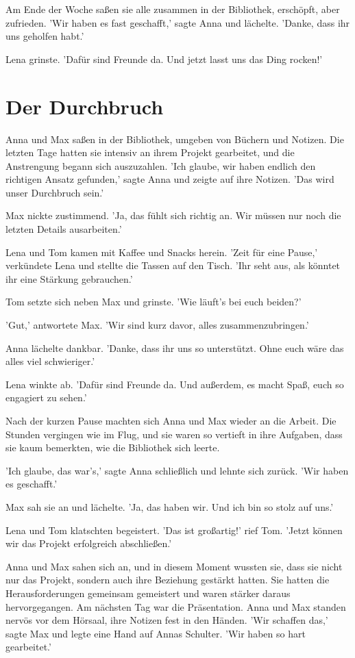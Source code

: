 \documentclass[12pt]{article}
\begin{document}
Am Ende der Woche saßen sie alle zusammen in der Bibliothek, erschöpft, aber zufrieden. 'Wir haben es fast geschafft,' sagte Anna und lächelte. 'Danke, dass ihr uns geholfen habt.'

Lena grinste. 'Dafür sind Freunde da. Und jetzt lasst uns das Ding rocken!'

\section{ Der Durchbruch }
 Anna und Max saßen in der Bibliothek, umgeben von Büchern und Notizen. Die letzten Tage hatten sie intensiv an ihrem Projekt gearbeitet, und die Anstrengung begann sich auszuzahlen. 'Ich glaube, wir haben endlich den richtigen Ansatz gefunden,' sagte Anna und zeigte auf ihre Notizen. 'Das wird unser Durchbruch sein.'

Max nickte zustimmend. 'Ja, das fühlt sich richtig an. Wir müssen nur noch die letzten Details ausarbeiten.'

Lena und Tom kamen mit Kaffee und Snacks herein. 'Zeit für eine Pause,' verkündete Lena und stellte die Tassen auf den Tisch. 'Ihr seht aus, als könntet ihr eine Stärkung gebrauchen.'

Tom setzte sich neben Max und grinste. 'Wie läuft's bei euch beiden?'

'Gut,' antwortete Max. 'Wir sind kurz davor, alles zusammenzubringen.'

Anna lächelte dankbar. 'Danke, dass ihr uns so unterstützt. Ohne euch wäre das alles viel schwieriger.'

Lena winkte ab. 'Dafür sind Freunde da. Und außerdem, es macht Spaß, euch so engagiert zu sehen.'

Nach der kurzen Pause machten sich Anna und Max wieder an die Arbeit. Die Stunden vergingen wie im Flug, und sie waren so vertieft in ihre Aufgaben, dass sie kaum bemerkten, wie die Bibliothek sich leerte.

'Ich glaube, das war's,' sagte Anna schließlich und lehnte sich zurück. 'Wir haben es geschafft.'

Max sah sie an und lächelte. 'Ja, das haben wir. Und ich bin so stolz auf uns.'

Lena und Tom klatschten begeistert. 'Das ist großartig!' rief Tom. 'Jetzt können wir das Projekt erfolgreich abschließen.'

Anna und Max sahen sich an, und in diesem Moment wussten sie, dass sie nicht nur das Projekt, sondern auch ihre Beziehung gestärkt hatten. Sie hatten die Herausforderungen gemeinsam gemeistert und waren stärker daraus hervorgegangen. Am nächsten Tag war die Präsentation. Anna und Max standen nervös vor dem Hörsaal, ihre Notizen fest in den Händen. 'Wir schaffen das,' sagte Max und legte eine Hand auf Annas Schulter. 'Wir haben so hart gearbeitet.'
\end{document}

